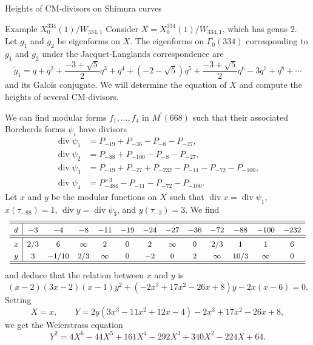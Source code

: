 \documentclass{amsart}
\theoremstyle{definition}
\def\div{\operatorname{div}}
\begin{document}
\begin{section}{Heights of CM-divisors on Shimura curves}
\begin{subsection}{Example $X_0^{334}(1)/W_{334,1}$}
Consider $X=X_0^{334}(1)/W_{334,1}$, which has genus $2$. Let $g_1$ and $g_2$ be
eigenforms on $X$. The eigenforms on $\Gamma_0(334)$ corresponding to
$g_1$ and $g_2$ under the Jacquet-Langlands correspondence are
$$
  \widetilde g_1=q+q^2+\frac{-3+\sqrt5}2q^3+q^4+(-2-\sqrt5)q^5
     +\frac{-3+\sqrt5}2q^6-3q^7+q^8+\cdots
$$
and its Galois conjugate. We will determine the equation of $X$ and
compute the heights of several CM-divisors.

We can find modular forms $f_1,\ldots,f_4$ in $M^!(668)$ such that
their associated Borcherds forms $\psi_i$ have divisors
\begin{equation*}
\begin{split}
  \div\psi_{1}&=P_{-19}+P_{-36}-P_{-8}-P_{-27}, \\
  \div\psi_{2}&=P_{-88}+P_{-100}-P_{-8}-P_{-27}, \\
  \div\psi_{3}&=P_{-19}+P_{-27}+P_{-232}-P_{-11}-P_{-72}-P_{-100}, \\
  \div\psi_{4}&=P_{-484}^{\times 3}-P_{-11}-P_{-72}-P_{-100}.
\end{split}
\end{equation*}
Let $x$ and $y$ be the modular functions on $X$ such that
$\div x=\div\psi_{1}$, $x(\tau_{-88})=1$, $\div y=\div\psi_{3}$, and
$y(\tau_{-3})=3$. We find
$$ \small\extrarowheight3pt
\begin{array}{c|cccccccccccc} \hline\hline
 d & -3 & -4 & -8 & -11& -19 & -24& -27& -36& -72& -88&-100&-232 \\ \hline\hline
 x & 2/3&  6&\infty& 2 &  0  & 2 &\infty& 0 & 2/3&  1 & 1  &  6 \\
 y & 3 &-1/10& 2/3&\infty& 0 & -2 & 0  & 2 &\infty&10/3&\infty& 0 \\
\hline\hline
\end{array}
$$
and deduce that the relation between $x$ and $y$ is
$$
  (x-2)(3x-2)(x-1)y^2+(-2x^3+17x^2-26x+8)y-2x(x-6)=0.
$$
Setting
$$
  X=x, \qquad Y=2y(3x^3-11x^2+12x-4)-2x^3+17x^2-26x+8,
$$
we get the Weierstrass equation
$$
  Y^2=4X^6-44X^5+161X^4-292X^3+340X^2-224X+64.
$$


\end{subsection}
\end{section}
\end{document}
